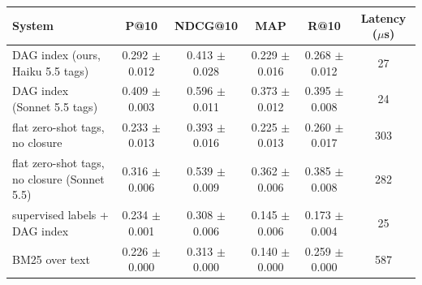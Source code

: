 \begin{tabular}{lccccc}
\toprule
System & P@10 & NDCG@10 & MAP & R@10 & Latency ($\mu$s) \\
\midrule
DAG index (ours, Haiku 5.5 tags) & 0.292 $\pm$ 0.012 & 0.413 $\pm$ 0.028 & 0.229 $\pm$ 0.016 & 0.268 $\pm$ 0.012 & 27 \\
DAG index (Sonnet 5.5 tags) & 0.409 $\pm$ 0.003 & 0.596 $\pm$ 0.011 & 0.373 $\pm$ 0.012 & 0.395 $\pm$ 0.008 & 24 \\
flat zero-shot tags, no closure & 0.233 $\pm$ 0.013 & 0.393 $\pm$ 0.016 & 0.225 $\pm$ 0.013 & 0.260 $\pm$ 0.017 & 303 \\
flat zero-shot tags, no closure (Sonnet 5.5) & 0.316 $\pm$ 0.006 & 0.539 $\pm$ 0.009 & 0.362 $\pm$ 0.006 & 0.385 $\pm$ 0.008 & 282 \\
supervised labels + DAG index & 0.234 $\pm$ 0.001 & 0.308 $\pm$ 0.006 & 0.145 $\pm$ 0.006 & 0.173 $\pm$ 0.004 & 25 \\
BM25 over text & 0.226 $\pm$ 0.000 & 0.313 $\pm$ 0.000 & 0.140 $\pm$ 0.000 & 0.259 $\pm$ 0.000 & 587 \\
\bottomrule
\end{tabular}
